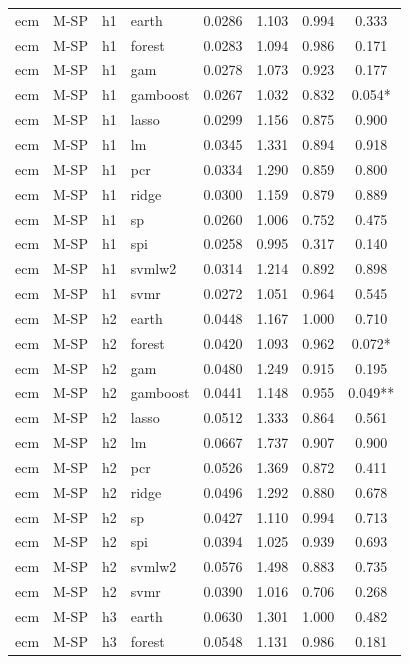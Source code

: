 \begin{ThreePartTable}
\begin{longtable}[t]{llclcccc}
\addlinespace
ecm & M-SP & h1 & earth & 0.0286 & 1.103 & 0.994 & 0.333\\
ecm & M-SP & h1 & forest & 0.0283 & 1.094 & 0.986 & 0.171\\
ecm & M-SP & h1 & gam & 0.0278 & 1.073 & 0.923 & 0.177\\
ecm & M-SP & h1 & gamboost & 0.0267 & 1.032 & 0.832 & 0.054*\\
ecm & M-SP & h1 & lasso & 0.0299 & 1.156 & 0.875 & 0.900\\
ecm & M-SP & h1 & lm & 0.0345 & 1.331 & 0.894 & 0.918\\
ecm & M-SP & h1 & pcr & 0.0334 & 1.290 & 0.859 & 0.800\\
ecm & M-SP & h1 & ridge & 0.0300 & 1.159 & 0.879 & 0.889\\
ecm & M-SP & h1 & sp & 0.0260 & 1.006 & 0.752 & 0.475\\
ecm & M-SP & h1 & spi & 0.0258 & 0.995 & 0.317 & 0.140\\
ecm & M-SP & h1 & svmlw2 & 0.0314 & 1.214 & 0.892 & 0.898\\
ecm & M-SP & h1 & svmr & 0.0272 & 1.051 & 0.964 & 0.545\\
\addlinespace
ecm & M-SP & h2 & earth & 0.0448 & 1.167 & 1.000 & 0.710\\
ecm & M-SP & h2 & forest & 0.0420 & 1.093 & 0.962 & 0.072*\\
ecm & M-SP & h2 & gam & 0.0480 & 1.249 & 0.915 & 0.195\\
ecm & M-SP & h2 & gamboost & 0.0441 & 1.148 & 0.955 & 0.049**\\
ecm & M-SP & h2 & lasso & 0.0512 & 1.333 & 0.864 & 0.561\\
ecm & M-SP & h2 & lm & 0.0667 & 1.737 & 0.907 & 0.900\\
ecm & M-SP & h2 & pcr & 0.0526 & 1.369 & 0.872 & 0.411\\
ecm & M-SP & h2 & ridge & 0.0496 & 1.292 & 0.880 & 0.678\\
ecm & M-SP & h2 & sp & 0.0427 & 1.110 & 0.994 & 0.713\\
ecm & M-SP & h2 & spi & 0.0394 & 1.025 & 0.939 & 0.693\\
ecm & M-SP & h2 & svmlw2 & 0.0576 & 1.498 & 0.883 & 0.735\\
ecm & M-SP & h2 & svmr & 0.0390 & 1.016 & 0.706 & 0.268\\
\addlinespace
ecm & M-SP & h3 & earth & 0.0630 & 1.301 & 1.000 & 0.482\\
ecm & M-SP & h3 & forest & 0.0548 & 1.131 & 0.986 & 0.181\\

\end{longtable}
\end{ThreePartTable}
